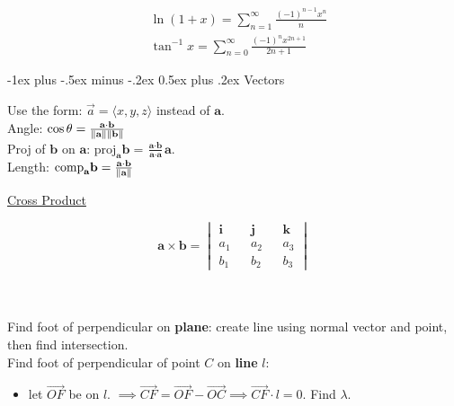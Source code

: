 \documentclass[10pt]{article}
\makeatletter
\renewcommand{\section}{\@startsection{section}{1}{0mm}%
                                {-1ex plus -.5ex minus -.2ex}%
                                {0.5ex plus .2ex}%
                                {\normalfont\large\bfseries}}
\renewcommand{\subsection}{\@startsection{subsection}{2}{0mm}%
                                {-1explus -.5ex minus -.2ex}%
                                {0.5ex plus .2ex}%
                                {\normalfont\normalsize\bfseries}}
\makeatother
\begin{document}
\begin{multicols}{2}
\begin{multicols*}{2}
    \begin{align*}
        & \ln (1+x )= \sum_{n=1}^{\infty} \frac{(-1)^{n-1}x^n}{n} \\
        & \tan^{-1} x = \sum_{n=0}^{\infty} \frac{(-1)^n x^{2n+1}}{2n+1}
    \end{align*}
\end{multicols*}









\divider
\section{Vectors}
\begin{multicols*}{2}
    Use the form: $\vec{a} = \langle x, y, z \rangle$ instead of $\textbf{a}$.\\ 
    Angle: $\cos \theta = \frac{\textbf{a} \cdot \textbf{b}}{\norm{\textbf{a}} \norm{\textbf{b}}}$ \\
    Proj of $\textbf{b}$ on $\textbf{a}$: $\text{proj}_\textbf{a}\textbf{b} =  \frac{\textbf{a} \cdot \textbf{b}}{\textbf{a} \cdot \textbf{a}} \textbf{a}$.\\
    Length: $\text{comp}_\textbf{a}\textbf{b} =  \frac{\textbf{a} \cdot \textbf{b}}{\norm{\textbf{a}} }$ 
    \begin{center}
        \underline{Cross Product}
    \end{center}
    \[\textbf{a} \times \textbf{b} = \begin{vmatrix}
    \textbf{i} && \textbf{j} && \textbf{k} \\
    a_1 && a_2 && a_3 \\
    b_1 && b_2 && b_3 
    \end{vmatrix}\]
    \\ \; \\ \; 
\end{multicols*}
Find foot of perpendicular on \textbf{plane}: create line using normal vector and point, then find intersection. \\
Find foot of perpendicular of point $C$ on \textbf{line} $l$:
\begin{itemize}
    \item[] let $\vec{OF}$ be on $l$. $\implies \vec{CF} = \vec{OF} - \vec{OC} \implies \vec{CF} \cdot l = 0$. Find $\lambda$.
\end{itemize}



\end{multicols}
\end{document}
